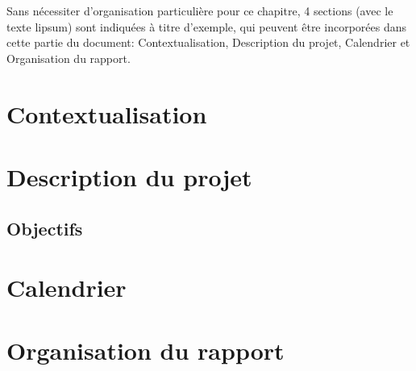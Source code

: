 Sans nécessiter d'organisation particulière pour ce chapitre, 4 sections (avec le texte \gls{lipsum}) sont indiquées à titre d'exemple, qui peuvent être incorporées dans cette partie du document: Contextualisation, Description du projet, Calendrier et Organisation du rapport.

\section{Contextualisation}
\label{sec:Ch1.1}

\lipsum[1] %


\section{Description du projet}
\label{sec:Ch1.2}

\lipsum[2]


\subsection{Objectifs}
\label{sub:Ch1.2.1}

\lipsum[2]


\section{Calendrier}
\label{sec:Ch1.3}

\lipsum[1]



\section{Organisation du rapport}
\label{sec:Ch1.4}

\lipsum[2]

